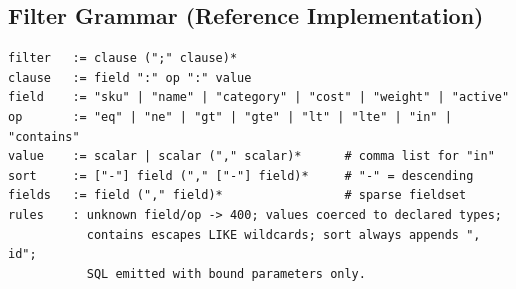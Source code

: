 \subsection*{Filter Grammar (Reference Implementation)}
\begin{verbatim}
filter   := clause (";" clause)*
clause   := field ":" op ":" value
field    := "sku" | "name" | "category" | "cost" | "weight" | "active"
op       := "eq" | "ne" | "gt" | "gte" | "lt" | "lte" | "in" | "contains"
value    := scalar | scalar ("," scalar)*      # comma list for "in"
sort     := ["-"] field ("," ["-"] field)*     # "-" = descending
fields   := field ("," field)*                 # sparse fieldset
rules    : unknown field/op -> 400; values coerced to declared types;
           contains escapes LIKE wildcards; sort always appends ", id";
           SQL emitted with bound parameters only.
\end{verbatim}


